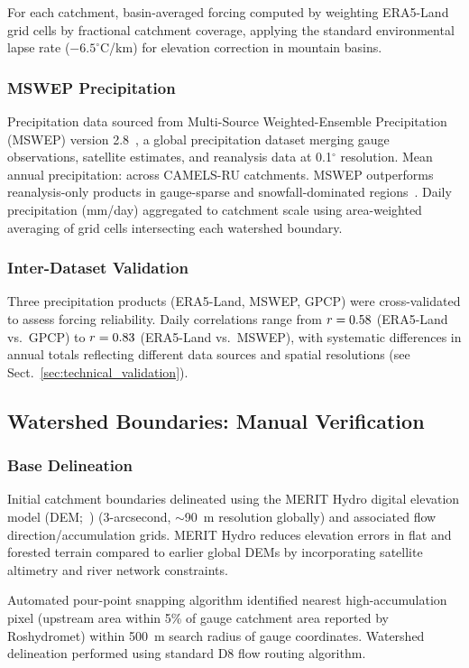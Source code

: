 For each catchment, basin-averaged forcing computed by weighting ERA5-Land grid cells by fractional catchment coverage, applying the standard environmental lapse rate ($-6.5^\circ$C/km) for elevation correction in mountain basins.

\subsubsection{MSWEP Precipitation}
Precipitation data sourced from Multi-Source Weighted-Ensemble Precipitation (MSWEP) version 2.8~\citep{Beck2019MSWEP}, a global precipitation dataset merging gauge observations, satellite estimates, and reanalysis data at 0.1$^\circ$ resolution.
Mean annual precipitation: \mswepannual across CAMELS-RU catchments.
MSWEP outperforms reanalysis-only products in gauge-sparse and snowfall-dominated regions~\citep{Beck2017MSWEP}.
Daily precipitation (mm/day) aggregated to catchment scale using area-weighted averaging of grid cells intersecting each watershed boundary.

\subsubsection{Inter-Dataset Validation}
Three precipitation products (ERA5-Land, MSWEP, GPCP) were cross-validated to assess forcing reliability.
Daily correlations range from $r = 0.58$ (ERA5-Land vs.\ GPCP) to $r = 0.83$ (ERA5-Land vs.\ MSWEP), with systematic differences in annual totals reflecting different data sources and spatial resolutions (see Sect.~\ref{sec:technical_validation}).

\subsection{Watershed Boundaries: Manual Verification}
\subsubsection{Base Delineation}
Initial catchment boundaries delineated using the MERIT Hydro digital elevation model (DEM;~\citealt{Yamazaki2019}) (3-arcsecond, $\sim$90~m resolution globally) and associated flow direction/accumulation grids.
MERIT Hydro reduces elevation errors in flat and forested terrain compared to earlier global DEMs by incorporating satellite altimetry and river network constraints.

Automated pour-point snapping algorithm identified nearest high-accumulation pixel (upstream area within 5\% of gauge catchment area reported by Roshydromet) within 500~m search radius of gauge coordinates.
Watershed delineation performed using standard D8 flow routing algorithm.

